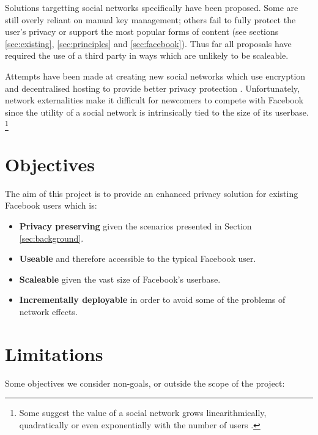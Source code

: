 Solutions targetting social networks specifically have been proposed. Some are still overly reliant on manual key management; others fail to fully protect the user's privacy or support the most popular forms of content (see sections \ref{sec:existing}, \ref{sec:principles} and \ref{sec:facebook}). Thus far all proposals have required the use of a third party in ways which are unlikely to be scaleable.
  
Attempts have been made at creating new social networks which use encryption and decentralised hosting to provide better privacy protection \cite{pidder}\cite{diaspora}. Unfortunately, network externalities make it difficult for newcomers to compete with Facebook since the utility of a social network is intrinsically tied to the size of its userbase. \footnote{Some suggest the value of a social network grows linearithmically, quadratically or even exponentially with the number of users \cite{fb-network} \cite{metcalf}.}


\section{Objectives}
\label{sec:objectives}

The aim of this project is to provide an enhanced privacy solution for existing Facebook users which is:

\begin{itemize}

    \item \textbf{Privacy preserving} given the scenarios presented in Section \ref{sec:background}.

    \item \textbf{Useable} and therefore accessible to the typical Facebook user.

    \item \textbf{Scaleable} given the vast size of Facebook's userbase. 
    
    \item \textbf{Incrementally deployable} in order to avoid some of the problems of network effects.

\end{itemize}


\section{Limitations}
\label{sec:limit}

Some objectives we consider non-goals, or outside the scope of the project:

